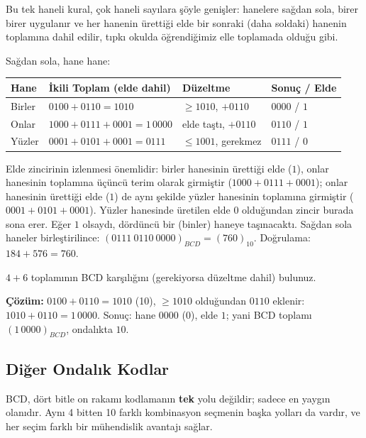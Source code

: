 Bu tek haneli kural, çok haneli sayılara şöyle genişler: hanelere sağdan sola, birer birer
uygulanır ve her hanenin ürettiği elde bir sonraki (daha soldaki) hanenin toplamına dahil
edilir, tıpkı okulda öğrendiğimiz elle toplamada olduğu gibi.

\begin{ornek}
Sağdan sola, hane hane:
\begin{center}
\small
\begin{tabular}{@{}lp{4.2cm}p{2.6cm}p{2.4cm}@{}}
\toprule
Hane & İkili Toplam (elde dahil) & Düzeltme & Sonuç / Elde \\
\midrule
Birler & $0100+0110=1010$ & $\ge1010$, $+0110$ & $0000$ / $1$ \\
Onlar & $1000+0111+0001=1\,0000$ & elde taştı, $+0110$ & $0110$ / $1$ \\
Yüzler & $0001+0101+0001=0111$ & $\le1001$, gerekmez & $0111$ / $0$ \\
\bottomrule
\end{tabular}
\end{center}
Elde zincirinin izlenmesi önemlidir: birler hanesinin ürettiği elde ($1$), onlar hanesinin
toplamına üçüncü terim olarak girmiştir ($1000+0111+0001$); onlar hanesinin ürettiği elde
($1$) de aynı şekilde yüzler hanesinin toplamına girmiştir ($0001+0101+0001$). Yüzler
hanesinde üretilen elde $0$ olduğundan zincir burada sona erer. Eğer $1$ olsaydı, dördüncü
bir (binler) haneye taşınacaktı. Sağdan sola haneler birleştirilince: $(0111\ 0110\
0000)_{BCD}=(760)_{10}$. Doğrulama: $184+576=760$. \checkmark
\end{ornek}

\begin{alistirma}[\kolay]
$4+6$ toplamının BCD karşılığını (gerekiyorsa düzeltme dahil) bulunuz.
\end{alistirma}

\noindent\textbf{Çözüm:} $0100+0110=1010$ (10), $\ge1010$ olduğundan $0110$ eklenir:
$1010+0110=1\,0000$. Sonuç: hane $0000$ (0), elde $1$; yani BCD toplamı
$(1\,0000)_{BCD}$, ondalıkta $10$.

\subsection{Diğer Ondalık Kodlar}
\label{sec:diger-ondalik-kodlar}

BCD, dört bitle on rakamı kodlamanın \textbf{tek} yolu değildir; sadece en yaygın
olanıdır. Aynı 4 bitten 10 farklı kombinasyon seçmenin başka yolları da vardır, ve her seçim
farklı bir mühendislik avantajı sağlar.

